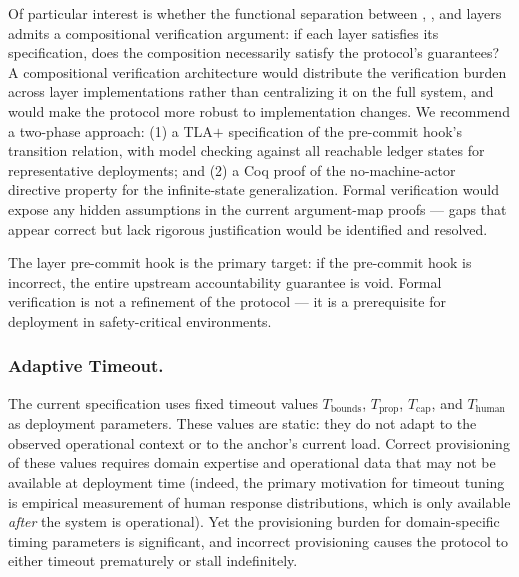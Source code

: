 Of particular interest is whether the functional separation between \purpose{}, \bounds{}, and \fact{} layers admits a compositional verification argument: if each layer satisfies its specification, does the composition necessarily satisfy the protocol's guarantees? A compositional verification architecture would distribute the verification burden across layer implementations rather than centralizing it on the full system, and would make the protocol more robust to implementation changes. We recommend a two-phase approach: (1) a TLA$+$ specification of the pre-commit hook's transition relation, with model checking against all reachable ledger states for representative deployments; and (2) a Coq proof of the no-machine-actor directive property for the infinite-state generalization. Formal verification would expose any hidden assumptions in the current argument-map proofs --- gaps that appear correct but lack rigorous justification would be identified and resolved.

The \fact{} layer pre-commit hook is the primary target: if the pre-commit hook is incorrect, the entire upstream accountability guarantee is void. Formal verification is not a refinement of the protocol --- it is a prerequisite for deployment in safety-critical environments.

\subsubsection{Adaptive Timeout.}
The current specification uses fixed timeout values $T_{\mathrm{bounds}}$, $T_{\mathrm{prop}}$, $T_{\mathrm{cap}}$, and $T_{\mathrm{human}}$ as deployment parameters. These values are static: they do not adapt to the observed operational context or to the anchor's current load. Correct provisioning of these values requires domain expertise and operational data that may not be available at deployment time (indeed, the primary motivation for timeout tuning is empirical measurement of human response distributions, which is only available \emph{after} the system is operational). Yet the provisioning burden for domain-specific timing parameters is significant, and incorrect provisioning causes the protocol to either timeout prematurely or stall indefinitely.

